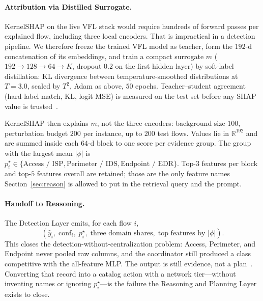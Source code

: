 \paragraph{Attribution via Distilled Surrogate.}
KernelSHAP on the live VFL stack would require hundreds of forward passes per explained flow, including three local encoders. That is impractical in a detection pipeline. We therefore freeze the trained VFL model as teacher, form the $192$-d concatenation of its embeddings, and train a compact surrogate $m$ ($192\rightarrow 128\rightarrow 64\rightarrow K$, dropout $0.2$ on the first hidden layer) by soft-label distillation: KL divergence between temperature-smoothed distributions at $T=3.0$, scaled by $T^2$, Adam as above, $50$ epochs. Teacher--student agreement (hard-label match, KL, logit MSE) is measured on the test set before any SHAP value is trusted~\cite{wu2023falcon}.

KernelSHAP then explains $m$, not the three encoders: background size $100$, perturbation budget $200$ per instance, up to $200$ test flows. Values lie in $\mathbb{R}^{192}$ and are summed inside each $64$-d block to one score per evidence group. The group with the largest mean $\lvert\phi\rvert$ is $p_i^{\star}\in\{\text{Access~/~ISP},\text{Perimeter~/~IDS},\text{Endpoint~/~EDR}\}$. Top-$3$ features per block and top-$5$ features overall are retained; those are the only feature names Section~\ref{sec:reason} is allowed to put in the retrieval query and the prompt.

\paragraph{Handoff to Reasoning.}
The Detection Layer emits, for each flow $i$,
\[
(\hat{y}_i,\; \mathrm{conf}_i,\; p_i^{\star},\; \text{three domain shares},\; \text{top features by }\lvert\phi\rvert).
\]
This closes the detection-without-centralization problem: Access, Perimeter, and Endpoint never pooled raw columns, and the coordinator still produced a class competitive with the all-feature MLP. The output is still evidence, not a plan~\cite{li2025}. Converting that record into a catalog action with a network tier---without inventing names or ignoring $p_i^{\star}$---is the failure the Reasoning and Planning Layer exists to close.
